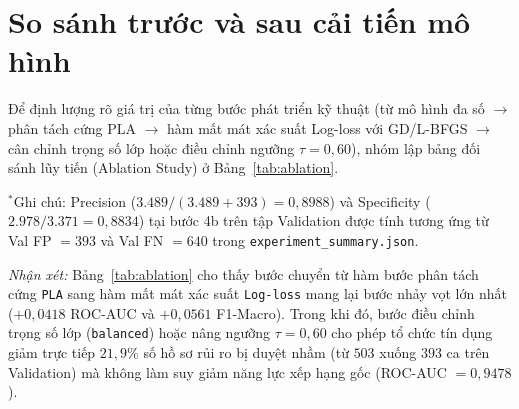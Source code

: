 \documentclass[12pt,a4paper,oneside]{report}
\begin{document}
\section{So sánh trước và sau cải tiến mô hình}

Để định lượng rõ giá trị của từng bước phát triển kỹ thuật (từ mô hình đa số $\rightarrow$ phân tách cứng PLA $\rightarrow$ hàm mất mát xác suất Log-loss với GD/L-BFGS $\rightarrow$ cân chỉnh trọng số lớp hoặc điều chỉnh ngưỡng $\tau = 0{,}60$), nhóm lập bảng đối sánh lũy tiến (Ablation Study) ở Bảng~\ref{tab:ablation}.

\begin{table}[H]
  \caption{So sánh cải tiến lũy tiến qua các bước mô hình hóa và tinh chỉnh trên tập Validation ($N=7.500$).}
  \label{tab:ablation}
\end{table}

{\footnotesize $^*$Ghi chú: Precision ($3.489 / (3.489 + 393) = 0{,}8988$) và Specificity ($2.978 / 3.371 = 0{,}8834$) tại bước 4b trên tập Validation được tính tương ứng từ Val FP $= 393$ và Val FN $= 640$ trong \texttt{experiment\_summary.json}.}

\textit{Nhận xét:} Bảng~\ref{tab:ablation} cho thấy bước chuyển từ hàm bước phân tách cứng \texttt{PLA} sang hàm mất mát xác suất \texttt{Log-loss} mang lại bước nhảy vọt lớn nhất ($+0{,}0418$ ROC-AUC và $+0{,}0561$ F1-Macro). Trong khi đó, bước điều chỉnh trọng số lớp (\texttt{balanced}) hoặc nâng ngưỡng $\tau = 0{,}60$ cho phép tổ chức tín dụng giảm trực tiếp $21{,}9\%$ số hồ sơ rủi ro bị duyệt nhầm (từ $503$ xuống $393$ ca trên Validation) mà không làm suy giảm năng lực xếp hạng gốc (ROC-AUC $= 0{,}9478$).
\end{document}
